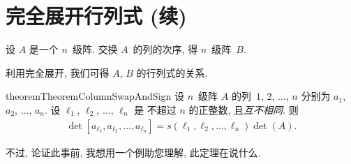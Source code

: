\section{完全展开行列式 (续)}
\SenAsteriskoEnEnhavtabelo

\maldevigalegajxo


设 \(A\) 是一个 \(n\)~级阵.
交换 \(A\)~的列的次序, 得 \(n\)~级阵~\(B\).

利用完全展开, 我们可得 \(A\), \(B\) 的行列式的关系.

\begin{restatable}[]{theorem}{TheoremColumnSwapAndSign}
    设 \(n\)~级阵 \(A\) 的列~\(1\), \(2\), \(\dots\), \(n\)
    分别为 \(a_1\), \(a_2\), \(\dots\), \(a_n\).
    设 \(\ell_1\), \(\ell_2\), \(\dots\), \(\ell_n\) 是%
    不超过 \(n\) 的正整数,
    且\emph{互不相同}.
    则
    \begin{align*}
        \det {[a_{\ell_1}, a_{\ell_2}, \dots, a_{\ell_n}]}
        = s(\ell_1, \ell_2, \dots, \ell_n) \det {(A)}.
    \end{align*}
\end{restatable}

不过, 论证此事前, 我想用一个例助您理解,
此定理在说什么.

